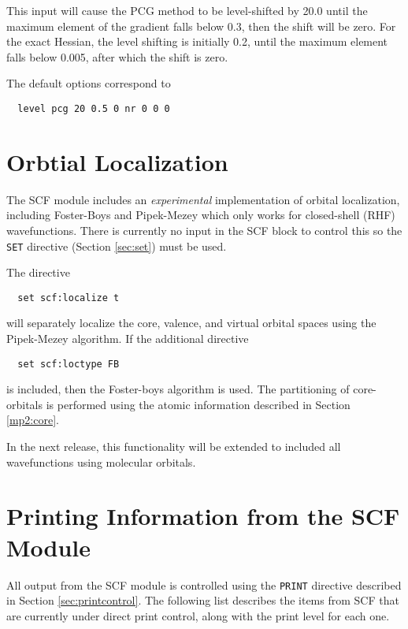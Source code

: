 This input will cause the PCG method to be level-shifted by 20.0 until
the maximum element of the gradient falls below 0.3, then the shift
will be zero.  For the exact Hessian, the level shifting is initially
0.2, until the maximum element falls below 0.005, after which the
shift is zero. 

The default options correspond to
\begin{verbatim}
  level pcg 20 0.5 0 nr 0 0 0
\end{verbatim}

\section{Orbtial Localization}

The SCF module includes an {\em experimental} implementation of
orbital localization, including Foster-Boys and Pipek-Mezey which only
works for closed-shell (RHF) wavefunctions. There is currently no
input in the SCF block to control this so the \verb+SET+ directive
(Section \ref{sec:set}) must be used.

The directive
\begin{verbatim}
  set scf:localize t
\end{verbatim}
will separately localize the core, valence, and virtual orbital spaces
using the Pipek-Mezey algorithm.  If the additional directive
\begin{verbatim}
  set scf:loctype FB
\end{verbatim}
is included, then the Foster-boys algorithm is used.  The partitioning
of core-orbitals is performed using the atomic information described
in Section \ref{mp2:core}.

In the next release, this functionality will be extended to included all
wavefunctions using molecular orbitals.


\newpage
\section{Printing Information from the SCF Module}
\label{sec:scfprint}

All output from the SCF module is controlled using the \verb+PRINT+
directive described in Section \ref{sec:printcontrol}.  The following 
list describes the items from SCF that are currently under direct 
print control, along with the print level for each one.

